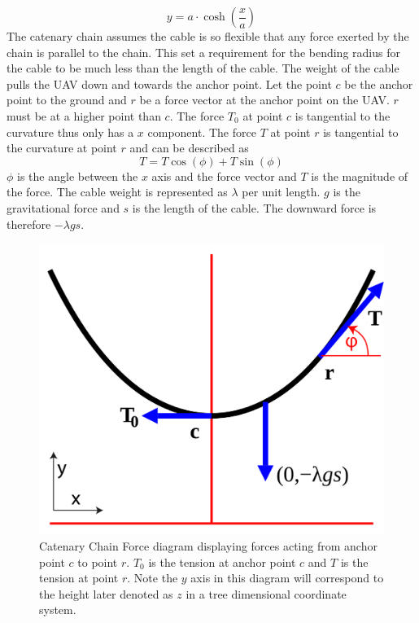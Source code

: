 \begin{equation}
y = a \cdot \cosh\left(\frac{x}{a}\right)
\end{equation}
The catenary chain assumes the cable is so flexible that any force exerted by the chain is parallel to the chain. This set a requirement for the bending radius for the cable to be much less than the length of the cable.
The weight of the cable pulls the UAV down and towards the anchor point. Let the point $c$ be the anchor point to the ground and $r$ be a force vector at the anchor point on the UAV. $r$ must be at a higher point than $c$. The force $T_0$ at point $c$ is tangential to the curvature thus only has a $x$ component. The force $T$ at point $r$ is tangential to the curvature at point $r$ and can be described as
\begin{equation}
T = T \cos(\phi) +  T\sin(\phi)
\end{equation} 
$\phi$ is the angle between the $x$ axis and the force vector and $T$ is the magnitude of the force. The cable weight is represented as $\lambda$ per unit length. $g$ is the gravitational force and $s$ is the length of the cable. The downward force is therefore $-\lambda g s$.

\begin{figure}[hbtp]
\centering
\includegraphics[scale=0.25]{graphics/CatenaryForceDiagram.png}
\caption[Catenary Chain Force diagram]{Catenary Chain Force diagram displaying forces acting from anchor point $c$ to point $r$. $T_0$ is the tension at anchor point $c$ and $T$ is the tension at point $r$. Note the $y$ axis in this diagram will correspond to the height later denoted as $z$ in a tree dimensional coordinate system.}
\label{fig:catenary_force_diagram}
\end{figure}

